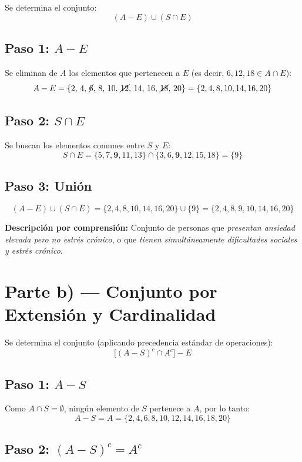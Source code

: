 \documentclass[12pt]{article}
\begin{document}
	Se determina el conjunto:
	\[
	(A - E) \cup (S \cap E)
	\]
	
	\subsection*{Paso 1: $A - E$}
	
	Se eliminan de $A$ los elementos que pertenecen a $E$
	(es decir, $6, 12, 18 \in A \cap E$):
	\[
	A - E
	= \{2,\, 4,\, \cancel{6},\, 8,\, 10,\, \cancel{12},\, 14,\, 16,\, \cancel{18},\, 20\}
	= \{2, 4, 8, 10, 14, 16, 20\}
	\]
	
	\subsection*{Paso 2: $S \cap E$}
	
	Se buscan los elementos comunes entre $S$ y $E$:
	\[
	S \cap E
	= \{5, 7, \mathbf{9}, 11, 13\} \cap \{3, 6, \mathbf{9}, 12, 15, 18\}
	= \{9\}
	\]
	
	\subsection*{Paso 3: Unión}
	
	\[
	(A - E) \cup (S \cap E)
	= \{2, 4, 8, 10, 14, 16, 20\} \cup \{9\}
	= \{2, 4, 8, 9, 10, 14, 16, 20\}
	\]
	
	\medskip
	\noindent\textbf{Descripción por comprensión:} Conjunto de personas que
	\textit{presentan ansiedad elevada pero no estrés crónico}, o que
	\textit{tienen simultáneamente dificultades sociales y estrés crónico}.
	
	\bigskip
	
	\section*{Parte b) — Conjunto por Extensión y Cardinalidad}
	
	Se determina el conjunto (aplicando precedencia estándar de operaciones):
	\[
	\bigl[(A - S)^c \cap A^c\bigr] - E
	\]
	
	\subsection*{Paso 1: $A - S$}
	
	Como $A \cap S = \emptyset$, ningún elemento de $S$ pertenece a $A$, por lo tanto:
	\[
	A - S = A = \{2, 4, 6, 8, 10, 12, 14, 16, 18, 20\}
	\]
	
	\subsection*{Paso 2: $(A - S)^c = A^c$}
	
\end{document}
